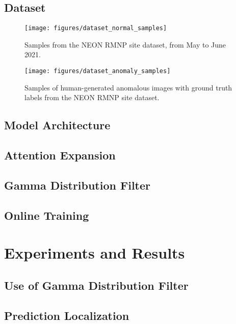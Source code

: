 \documentclass[12pt]{article}
\begin{document}
\subsection{Dataset}
\begin{figure}[H]
\begin{center}
\texttt{[image: figures/dataset\_normal\_samples]} \\
\end{center}
\caption{Samples from the NEON RMNP site dataset, from May to June 2021.}
\end{figure}

\begin{figure}[H]
\begin{center}
\texttt{[image: figures/dataset\_anomaly\_samples]}
\end{center}
\caption{Samples of human-generated anomalous images with ground truth labels from the NEON RMNP site dataset.}
\end{figure}

\subsection{Model Architecture}

\subsection{Attention Expansion}

\subsection{Gamma Distribution Filter}

\subsection{Online Training}
\section{Experiments and Results}

\subsection{Use of Gamma Distribution Filter}

\subsection{Prediction Localization}
\end{document}
